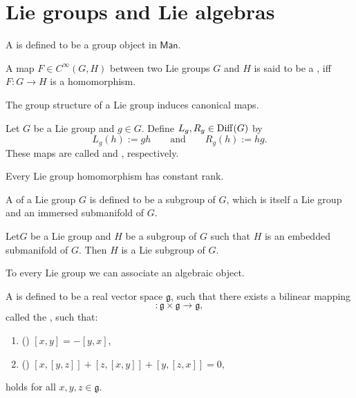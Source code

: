 \section*{Lie groups and Lie algebras}

\begin{definition}
	A  is defined to be a group object in $\mathsf{Man}$.
\end{definition}

\begin{definition}
	A map $F \in C^\infty(G,H)$ between two Lie groups $G$ and $H$ is said to be a , iff $F : G \to H$ is a homomorphism.
\end{definition}

The group structure of a Lie group induces canonical maps.

\begin{definition}[Translation]
	Let $G$ be a Lie group and $g \in G$. Define $L_g,R_g \in \operatorname{Diff}(G)$ by
	\begin{equation*}
		L_g(h) := gh \qquad \text{and} \qquad R_g(h) := hg.
	\end{equation*}
	\noindent These maps are called  and , respectively.
\end{definition}

\begin{proposition}
	Every Lie group homomorphism has constant rank.
\end{proposition}

\begin{definition}
	A  of a Lie group $G$ is defined to be a subgroup of $G$, which is itself a Lie group and an immersed submanifold of $G$.
\end{definition}

\begin{proposition}
	Let$G$ be a Lie group and $H$ be a subgroup of $G$ such that $H$ is an embedded submanifold of $G$. Then $H$ is a Lie subgroup of $G$.
\end{proposition}

To every Lie group we can associate an algebraic object.

\begin{definition}
	A  is defined to be a real vector space $\mathfrak{g}$, such that there exists a bilinear mapping
	\begin{equation*}
		[\>\cdot\>,\>\cdot\>] : \mathfrak{g} \times \mathfrak{g} \to \mathfrak{g},
	\end{equation*}
	\noindent called the , such that:
	\begin{enumerate}[label=\textup{(\roman*)},leftmargin=*]
		\item \textup{(}\textup{)} $[x,y] = -[y,x]$,
		\item \textup{(}\textup{)} $[x,[y,z]] + [z,[x,y]] + [y,[z,x]] = 0$,
	\end{enumerate}
	\noindent holds for all $x,y,z \in \mathfrak{g}$.
\end{definition}

